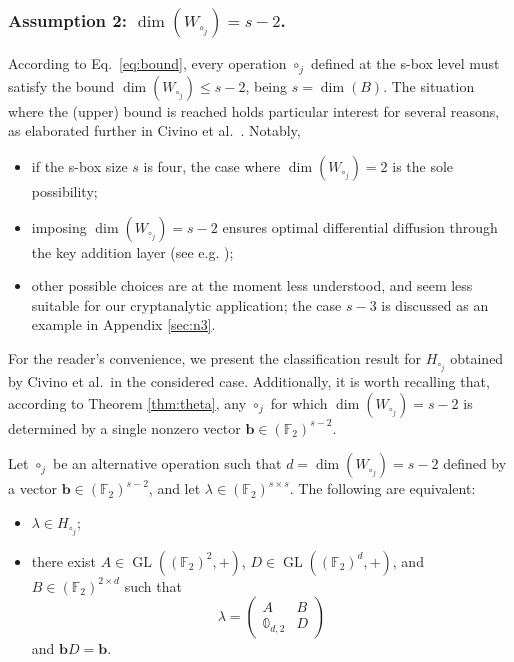 \documentclass[runningheads,a4paper,english]{llncs}
\newcommand{\F}{\mathbb{F}}
\newcommand{\lb}{\lambda}
\DeclareMathOperator{\GL}{GL}
\renewcommand{\b}{\textbf{b}}
\begin{document}
\subsubsection*{Assumption 2: $\dim(W_{\circ_j}) = s-2$.}
According to Eq.~\eqref{eq:bound}, every operation $\circ_j$ defined at the s-box level must satisfy the bound $\dim(W_{\circ_j}) \leq s-2$, being $s = \dim(B)$. 
The situation where the (upper) bound is reached holds particular interest for several reasons, as elaborated further in Civino et al.~\cite{civino2019differential}. Notably, 
\begin{itemize}
\item if the s-box size $s$ is four, the case where $\dim(W_{\circ_j}) = 2$ is the sole possibility;
\item imposing $\dim(W_{\circ_j}) = s - 2$ ensures optimal differential diffusion through the key addition layer (see e.g. \cite[Theorem 3.19]{civino2019differential});
\item other possible choices are at the moment less understood, and seem less suitable for our cryptanalytic application; the case $s-3$ is discussed as an example in Appendix \ref{sec:n3}.
\end{itemize}
For the reader's convenience, we present the classification result for $H_{\circ_j}$ obtained by Civino et al.\ in the considered case. Additionally, it is worth recalling that, according to Theorem \ref{thm:theta}, any $\circ_j$ for which $\dim(W_{\circ_j}) = s-2$ is determined by a single nonzero vector $\mathbf{b} \in (\F_2)^{s-2}$.

\begin{theorem}
	\label{thm:caratt_ho_semplice}
	Let $\circ_j$ be an alternative operation such that $d= \dim(W_{\circ_j}) = s-2$ defined by a vector $\b \in (\F_2)^{s-2}$, and let $\lb \in (\F_2)^{s\times s}$. The following are equivalent:
	\begin{itemize}
		\item $\lb \in H_{\circ_j}$;
		\item there exist $A \in \GL((\F_2)^2, +)$, $D \in \GL((\F_2)^d, +)$, and $B \in (\F_2)^{2 \times d}$ such that
		\[
		\lb = 
		\begin{pmatrix}
			A & B \\
			\mathbb{0}_{d,2} & D
		\end{pmatrix}
		\]
		and $\b D = \b$.
	\end{itemize} 
\end{theorem}
\end{document}
